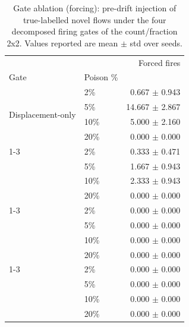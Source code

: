 \begin{table}
\caption{Gate ablation (forcing): pre-drift injection of true-labelled novel flows under the four decomposed firing gates of the count/fraction 2x2. Values reported are mean $\pm$ std over seeds.}
\label{tab:rq3-gate-forcing}
\centering
\begin{tabular}{llr}
\toprule
 &  & Forced fires \\
Gate & Poison \% &  \\
\midrule
\multirow[t]{4}{*}{Displacement-only} & 2\% & 0.667 $\pm$ 0.943 \\
 & 5\% & 14.667 $\pm$ 2.867 \\
 & 10\% & 5.000 $\pm$ 2.160 \\
 & 20\% & 0.000 $\pm$ 0.000 \\
\cline{1-3}
\multirow[t]{4}{*}{Count-only} & 2\% & 0.333 $\pm$ 0.471 \\
 & 5\% & 1.667 $\pm$ 0.943 \\
 & 10\% & 2.333 $\pm$ 0.943 \\
 & 20\% & 0.000 $\pm$ 0.000 \\
\cline{1-3}
\multirow[t]{4}{*}{Fraction-only} & 2\% & 0.000 $\pm$ 0.000 \\
 & 5\% & 0.000 $\pm$ 0.000 \\
 & 10\% & 0.000 $\pm$ 0.000 \\
 & 20\% & 0.000 $\pm$ 0.000 \\
\cline{1-3}
\multirow[t]{4}{*}{Full} & 2\% & 0.000 $\pm$ 0.000 \\
 & 5\% & 0.000 $\pm$ 0.000 \\
 & 10\% & 0.000 $\pm$ 0.000 \\
 & 20\% & 0.000 $\pm$ 0.000 \\
\bottomrule
\end{tabular}
\end{table}

